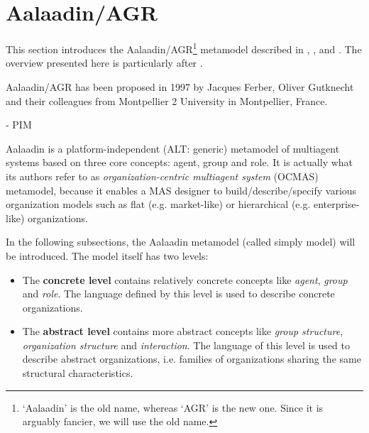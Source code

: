 \section{Aalaadin/AGR}

This section introduces the Aalaadin/AGR\footnote{`Aalaadin' is the old name, whereas `AGR' is the new one. Since it is arguably fancier, we will use the old name.} metamodel described in \cite{Ferber97}, \cite{Ferber98}, \cite{Ferber00} and \cite{Ferber03}.
The overview presented here is particularly after \cite{Ferber98}.

Aalaadin/AGR has been proposed in 1997 by Jacques Ferber, Oliver Gutknecht and their colleagues from Montpellier 2 University in Montpellier, France.


- PIM

Aalaadin is a platform-independent (ALT: generic) metamodel of multiagent systems based on three core concepts: agent, group and role.
It is actually what its authors refer to as \textit{organization-centric multiagent system} (OCMAS) metamodel, because it enables a MAS designer to build/describe/specify various organization models such as flat (e.g. market-like) or hierarchical (e.g. enterprise-like) organizations.

In the following subsections, the Aalaadin metamodel (called simply model) will be introduced.
The model itself has two levels:
\begin{itemize}
	\item The \textbf{concrete level} contains relatively concrete concepts like \textit{agent}, \textit{group} and \textit{role}.
	The language defined by this level is used to describe concrete organizations.
	\item The \textbf{abstract level} contains more abstract concepts like \textit{group structure}, \textit{organization structure} and \textit{interaction}. 
	The language of this level is used to describe abstract organizations, i.e. families of organizations sharing the same structural characteristics.
\end{itemize}

